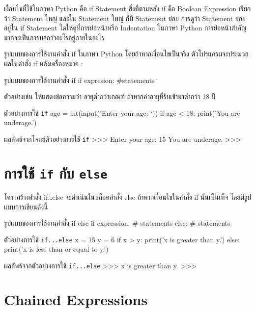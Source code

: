 เงื่อนไขที่ใช้ในภาษา Python คือ if Statement สิ่งที่ตามหลัง if คือ Boolean Expression เรียกว่า Statement ใหญ่ และใน Statement ใหญ่ ก็มี Statement ย่อย การดูว่า Statement ย่อยอยู่ใน if Statement ใดให้ดูที่การย่อหน้าหรือ Indentation ในภาษา Python การย่อหน้าสำคัญมากจะเป็นการบอกว่าอะไรอยู่ภายในอะไร 

รูปแบบของการใช้งานคำสั่ง if ในภาษา Python โดยถ้าหากเงื่อนไขเป็นจริง ตัวโปรแกรมจะประมวลผลในคำสั่ง if หลังเครื่องหมาย : 

\begin{codelist}{รูปแบบของการใช้งานคำสั่ง if}{}
if expresion:
    #statements
\end{codelist}

ตัวอย่างเช่น ให้แสดงข้อความว่า อายุต่ำกว่าเกณฑ์ ถ้าหากค่าอายุที่รับเข้ามาต่ำกว่า 18 ปี

\begin{codelist}{ตัวอย่างการใช้ \texttt{if}}{}
age = int(input('Enter your age: `))
if age < 18:
   print('You are underage.')
\end{codelist}

\begin{codelist}{ผลลัพธ์จากโจทย์ตัวอย่างการใช้ \texttt{if}}{}
>>>
Enter your age: 15
You are underage.
>>>
\end{codelist}


\section{การใช้ \texttt{if} กับ \texttt{else}}

โครงสร้างคำสั่ง if…else จะดำเนินในบล็อคคำสั่ง else ถ้าหากเงื่อนไขในคำสั่ง if นั้นเป็นเท็จ โดยมีรูปแบบการเขียนดังนี้

\begin{codelist}{รูปแบบของการใช้งานคำสั่ง if-else}{}
if expression:
    # statements
else:
    # statements
\end{codelist}


\begin{codelist}{ตัวอย่างการใช้ \texttt{if...else}}{}
x = 15
y = 6
if x > y: print('x is greater than y.')
else: print('x is less than or equal to y.')
\end{codelist}


\begin{codelist}{ผลลัพธ์จากตัวอย่างการใช้ \texttt{if...else}}{}
>>>
x is greater than y.
>>>
\end{codelist}


\section{Chained Expressions}

